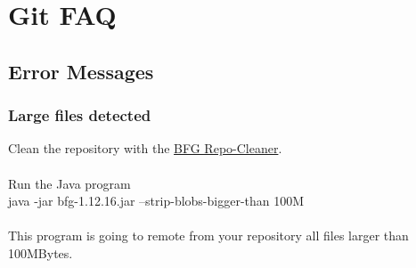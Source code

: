 
\chapter{Git FAQ}


\section{Error Messages}

\subsection{Large files detected}

Clean the repository with the \href{https://rtyley.github.io/bfg-repo-cleaner}{BFG Repo-Cleaner}.\\
\\
Run the Java program\\

java -jar bfg-1.12.16.jar --strip-blobs-bigger-than 100M\\
\\
This program is going to remote from your repository all files larger than 100MBytes.
